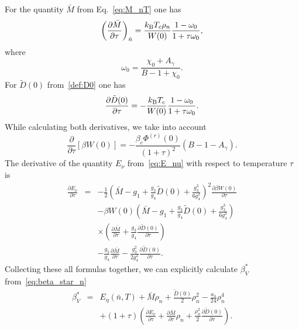 For the quantity $\bar{M}$ from Eq.~\eqref{eq:M_nT} one has
\begin{equation}
	\left( \frac{\partial \bar{M}}{\partial \tau} \right)_{\bar{n}} =
	\frac{k_{\rm B}T_c \rho_n}{W(0)} \frac{1 - \omega_0}{1 + \tau\omega_0},
\end{equation}
where
\begin{equation*}
	\omega_0 = \frac{\chi_0 + A_{\gamma}}{B - 1 + \chi_0}.
\end{equation*}
For $\tilde{D}(0)$ from~\eqref{def:D0} one has
\begin{equation}
	\frac{\partial \tilde{D}(0)}{\partial \tau} = -\frac{k_{\rm B}T_c}{W(0)} \frac{1 - \omega_0}{1 + \tau \omega_0}.
\end{equation}
While calculating both derivatives, we take into account
\begin{equation}
	\frac{\partial}{\partial \tau} \left[\beta W(0)\right] = -\frac{\beta_c \Phi^{(r)}(0)}{(1+\tau)^2} (B - 1 - A_{\gamma}).
\end{equation}
The derivative of the quantity $E_\nu$ from~\eqref{eq:E_nu} with respect to temperature $\tau$ is
\begin{eqnarray}
	\frac{\partial E_\nu}{\partial \tau} & = &  -\frac{1}{2}\left(\bar{M} - g_1 + \frac{g_3}{g_4} \tilde{D}(0) + \frac{g_3^3}{6g_4^2} \right)^{2} 
	\frac{\partial \beta W(0)}{\partial \tau} 
	\nonumber\\
	&&-\beta W(0)\left(\bar{M} - g_1 + \frac{g_3}{g_4} \tilde{D}(0) + \frac{g_3^3}{6g_4^2} \right)
	\nonumber\\
	&& \times \left(\frac{\partial \bar{M}}{\partial \tau} + \frac{g_3}{g_4}\frac{\partial\tilde{D}(0)}{\partial \tau}\right)
	\nonumber\\
	&& -\frac{g_3}{g_4}\frac{\partial \bar{M}}{\partial \tau} 
	- \frac{g_3^2}{2g_4^2}\frac{\partial \tilde{D}(0)}{\partial \tau}.
\end{eqnarray}
Collecting these all formulas together, we can explicitly calculate $\beta^*_V$ from~\eqref{eq:beta_star_n}
\begin{eqnarray}
	\beta^*_V & = & E_\eta (\bar{n},T) + \bar{M} \rho_{n} + \frac{\tilde D(0)}{2} \rho_{n}^2 - \frac{a_4}{24} \rho_{n}^4
	\nonumber\\
	&& + (1+\tau) \left(\frac{\partial E_{\nu}}{\partial \tau} + \frac{\partial \bar{M}}{\partial \tau}\rho_{n} + \frac{\rho_n^2}{2}\frac{\partial \tilde{D}(0)}{\partial \tau}\right).
\end{eqnarray}
